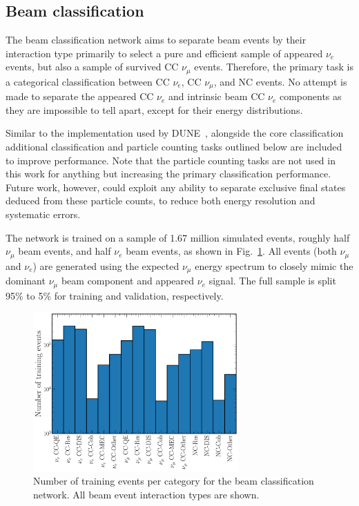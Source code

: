 \subsection{Beam classification}%
\label{sec:cvn_specific_beam} %

The beam classification network aims to separate beam events by their interaction type primarily
to select a pure and efficient sample of appeared $\nu_{e}$ events, but also a sample of survived
CC $\nu_{\mu}$ events. Therefore, the primary task is a categorical classification between CC
$\nu_{e}$, CC $\nu_{\mu}$, and NC events. No attempt is made to separate the appeared CC $\nu_{e}$
and intrinsic beam CC $\nu_{e}$ components as they are impossible to tell apart, except for their
energy distributions.

Similar to the implementation used by DUNE~\cite{collaboration2020}, alongside the core
classification additional classification and particle counting tasks outlined below are included
to improve performance. Note that the particle counting tasks are not used in this work for
anything but increasing the primary classification performance. Future work, however, could
exploit any ability to separate exclusive final states deduced from these particle counts, to
reduce both energy resolution and systematic errors.

The network is trained on a sample of 1.67 million simulated events, roughly half $\nu_{\mu}$ beam
events, and half $\nu_{e}$ beam events, as shown in Fig.~\ref{fig:beam_training_sample}. All
events (both $\nu_{\mu}$ and $\nu_{e}$) are generated using the expected \chips $\nu_{\mu}$ energy
spectrum to closely mimic the dominant $\nu_{\mu}$ beam component and appeared $\nu_{e}$ signal.
The full sample is split 95\% to 5\% for training and validation, respectively.

\begin{figure} %
    \includegraphics[width=0.7\textwidth]{diagrams/6-cvn/chipsnet/explore_beam_training_sample.pdf}
    \caption[Number of training events per category for the beam classification network.]
    {Number of training events per category for the beam classification network. All beam event
        interaction types are shown.}
    \label{fig:beam_training_sample}
\end{figure}


